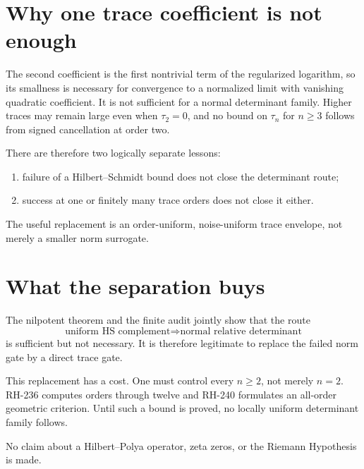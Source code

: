 \documentclass[11pt]{article}
\theoremstyle{remark}
\begin{document}
\section{Why one trace coefficient is not enough}

The second coefficient is the first nontrivial term of the regularized
logarithm, so its smallness is necessary for convergence to a normalized
limit with vanishing quadratic coefficient.  It is not sufficient for a
normal determinant family.  Higher traces may remain large even when
$\tau_2=0$, and no bound on $\tau_n$ for $n\ge3$ follows from signed
cancellation at order two.

There are therefore two logically separate lessons:
\begin{enumerate}[leftmargin=2em]
\item failure of a Hilbert--Schmidt bound does not close the determinant
route;
\item success at one or finitely many trace orders does not close it either.
\end{enumerate}
The useful replacement is an order-uniform, noise-uniform trace envelope,
not merely a smaller norm surrogate.

\section{What the separation buys}

The nilpotent theorem and the finite audit jointly show that the route
\[
 \text{uniform HS complement}
 \Longrightarrow
 \text{normal relative determinant}
\]
is sufficient but not necessary.  It is therefore legitimate to replace the
failed norm gate by a direct trace gate.

This replacement has a cost.  One must control every $n\ge2$, not merely
$n=2$.  RH-236 computes orders through twelve and RH-240 formulates an
all-order geometric criterion.  Until such a bound is proved, no locally
uniform determinant family follows.

No claim about a Hilbert--Polya operator, zeta zeros, or the Riemann
Hypothesis is made.



\end{document}
